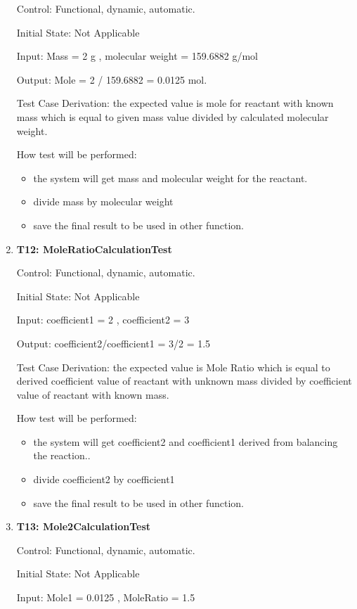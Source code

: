 \documentclass[12pt, titlepage]{article}
\begin{document}
\begin{enumerate}
Control: Functional, dynamic, automatic.
					
Initial State: Not Applicable
					
Input: Mass = 2 g , molecular weight = 159.6882 g/mol
			
Output:  Mole = 2 / 159.6882 =  0.0125 mol. 

Test Case Derivation: the expected value is mole for reactant with known mass which is equal to given mass value divided by calculated molecular weight. 	
				
How test will be performed: 
\begin{itemize}
\item the system will get mass and molecular weight  for the reactant.
\item divide mass by molecular weight 
\item save the final result to be used in other function.
\end{itemize}

\item{\bf T12: MoleRatioCalculationTest \\}

Control: Functional, dynamic, automatic.
					
Initial State: Not Applicable
					
Input: coefficient1 = 2  , coefficient2 = 3
			
Output:  coefficient2/coefficient1 = 3/2 = 1.5 

Test Case Derivation: the expected value is Mole Ratio which is equal to derived coefficient value of reactant with unknown mass divided by coefficient value of reactant with known mass.
 					
How test will be performed: 
\begin{itemize}
\item the system will get coefficient2 and coefficient1 derived from balancing the reaction..
\item divide coefficient2 by coefficient1  
\item save the final result to be used in other function.
\end{itemize}

\item{\bf T13: Mole2CalculationTest\\}

Control: Functional, dynamic, automatic.
					
Initial State: Not Applicable
					
Input: Mole1 = 0.0125  , MoleRatio = 1.5
			

\end{enumerate}
\end{document}
